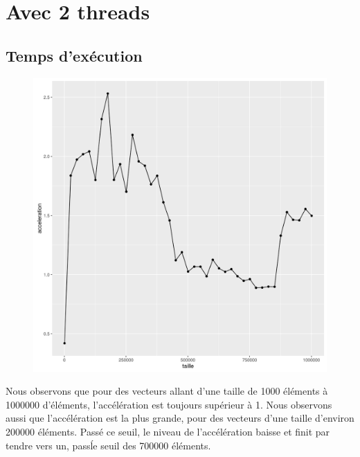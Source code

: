 \documentclass[a4paper,11pt]{scrartcl}
\begin{document}
\section{Avec 2 threads}
\subsection{Temps d'ex\'ecution}

\begin{figure}[H] \center
   \includegraphics[scale=0.5] {graphes/global_temps_machine_accel2.png}
\end{figure}

Nous observons que pour des vecteurs allant d'une taille de 1000 \'el\'ements \`a 1000000 d'\'el\'ements, l'acc\'el\'eration est toujours sup\'erieur \`a 1. Nous observons aussi que l'acc\'el\'eration est la plus grande, pour des vecteurs d'une taille d'environ 200000 \'el\'ements. Pass\'e ce seuil, le niveau de l'acc\'el\'eration baisse et finit par tendre vers un, pass\' le seuil des 700000 \'el\'ements.   
\end{document}
